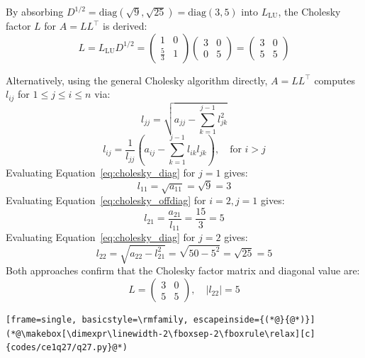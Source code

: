 \begin{enumerate}[label=\thesubsection.\arabic*, ref=\thesubsection.\theenumi, itemsep=0pt, leftmargin=*]
\begin{equation}
\end{equation}
By absorbing $D^{1/2} = \text{diag}(\sqrt{9}, \sqrt{25}) = \text{diag}(3, 5)$ into $L_{\text{LU}}$, the Cholesky factor $L$ for $A = LL^\top$ is derived:
\begin{equation}
    L = L_{\text{LU}} D^{1/2} = \begin{pmatrix} 1 & 0 \\ \frac{5}{3} & 1 \end{pmatrix} \begin{pmatrix} 3 & 0 \\ 0 & 5 \end{pmatrix} = \begin{pmatrix} 3 & 0 \\ 5 & 5 \end{pmatrix} \label{eq:cholesky_from_lu}
\end{equation}

Alternatively, using the general Cholesky algorithm directly, $A = LL^\top$ computes $l_{ij}$ for $1 \le j \le i \le n$ via:
\begin{equation}
    l_{jj} = \sqrt{a_{jj} - \sum_{k=1}^{j-1} l_{jk}^2} \label{eq:cholesky_diag}
\end{equation}
\begin{equation}
    l_{ij} = \frac{1}{l_{jj}} \left( a_{ij} - \sum_{k=1}^{j-1} l_{ik} l_{jk} \right), \quad \text{for } i > j \label{eq:cholesky_offdiag}
\end{equation}
Evaluating Equation~\eqref{eq:cholesky_diag} for $j = 1$ gives:
\begin{equation}
    l_{11} = \sqrt{a_{11}} = \sqrt{9} = 3 \label{eq:step_l11}
\end{equation}
Evaluating Equation~\eqref{eq:cholesky_offdiag} for $i = 2, j = 1$ gives:
\begin{equation}
    l_{21} = \frac{a_{21}}{l_{11}} = \frac{15}{3} = 5 \label{eq:step_l21}
\end{equation}
Evaluating Equation~\eqref{eq:cholesky_diag} for $j = 2$ gives:
\begin{equation}
    l_{22} = \sqrt{a_{22} - l_{21}^2} = \sqrt{50 - 5^2} = \sqrt{25} = 5 \label{eq:step_l22}
\end{equation}
Both approaches confirm that the Cholesky factor matrix and diagonal value are:
\begin{equation}
    L = \begin{pmatrix} 3 & 0 \\ 5 & 5 \end{pmatrix}, \quad |l_{22}| = 5 \label{eq:final_answer}
\end{equation}
\begin{lstlisting}[frame=single, basicstyle=\rmfamily, escapeinside={(*@}{@*)}]
(*@\makebox[\dimexpr\linewidth-2\fboxsep-2\fboxrule\relax][c]{codes/ce1q27/q27.py}@*)
\end{lstlisting}


\end{enumerate}
